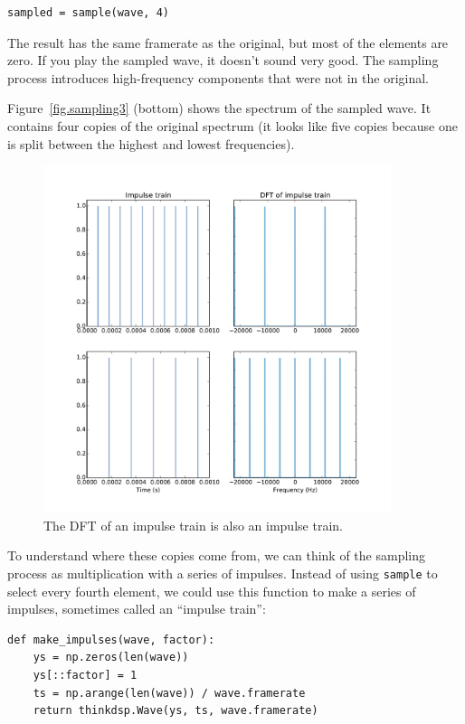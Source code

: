 \documentclass[12pt]{book}
\begin{document}
\begin{verbatim}
sampled = sample(wave, 4)
\end{verbatim}

The result has the same framerate as  the original, but most of the
elements are zero.  If you play the sampled wave, it doesn't sound
very good.  The sampling process introduces high-frequency
components that were not in the original.

Figure~\ref{fig.sampling3} (bottom) shows the spectrum of the sampled
wave.  It contains four copies of the original spectrum (it looks like
five copies because one is split between the highest and lowest
frequencies).

\begin{figure}
\centerline{\includegraphics[height=4in]{figs/sampling9.pdf}}
\caption{The DFT of an impulse train is also an impulse train.}
\label{fig.sampling9}
\end{figure}

To understand where these copies come from, we can think of the
sampling process as multiplication with a series of impulses.  Instead
of using {\tt sample} to select every fourth element, we could use
this function to make a series of impulses, sometimes called an
``impulse train'':
 
\begin{verbatim}
def make_impulses(wave, factor):
    ys = np.zeros(len(wave))
    ys[::factor] = 1
    ts = np.arange(len(wave)) / wave.framerate
    return thinkdsp.Wave(ys, ts, wave.framerate)
\end{verbatim}
\end{document}
